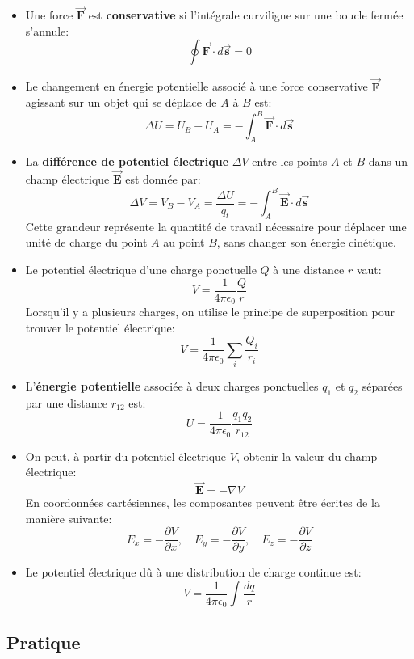 \documentclass[a4paper]{article}
\begin{document}
\begin{itemize}
    \item Une force $ \vec{\textbf{F}} $ est \textbf{conservative} si l'intégrale curviligne sur une boucle fermée s'annule: 
\[ \oint \vec{\textbf{F}} \cdot d \vec{\textbf{s}} = 0 \]
    \item Le changement en énergie potentielle associé à une force conservative $ \vec{\textbf{F}} $ agissant sur un objet qui se déplace 
de $ A $ à $ B $ est: \[ \Delta U = U_B - U_A = - \int_A^B \vec{\textbf{F}} \cdot d \vec{\textbf{s}} \]
    \item La \textbf{différence de potentiel électrique} $ \Delta V $ entre les points $ A $ et $ B $ dans un champ électrique 
$ \vec{\textbf{E}} $ est donnée par: \[ \Delta V = V_B - V_A = \frac{\Delta U}{q_t} = - \int_A^B \vec{\textbf{E}} \cdot d \vec{\textbf{s}} \]
Cette grandeur représente la quantité de travail nécessaire pour déplacer une unité de charge du point $ A $ au point $ B $, sans changer son énergie cinétique.
    \item Le potentiel électrique d'une charge ponctuelle $ Q $ à une distance $ r $ vaut: 
\[ V = \frac{1}{4 \pi \epsilon_0} \frac{Q}{r} \]
Lorsqu'il y a plusieurs charges, on utilise le principe de superposition pour trouver le potentiel électrique: 
\[ V = \frac{1}{4 \pi \epsilon_0} \sum_i \frac{Q_i}{r_i} \]
    \item L'\textbf{énergie potentielle} associée à deux charges ponctuelles $ q_1 $ et $ q_2 $ séparées par une distance $ r_{12} $ est:
\[ U = \frac{1}{4 \pi \epsilon_0} \frac{q_1 q_2}{r_{12}} \]
    \item On peut, à partir du potentiel électrique $ V $, obtenir la valeur du champ électrique: 
\[ \vec{\textbf{E}} = - \nabla V \]
En coordonnées cartésiennes, les composantes peuvent être écrites de la manière suivante: 
\[ E_x = - \frac{\partial V}{\partial x}, \quad E_y = - \frac{\partial V}{\partial y}, \quad E_z = - \frac{\partial V}{\partial z} \]
    \item Le potentiel électrique dû à une distribution de charge continue est: 
\[ V = \frac{1}{4 \pi \epsilon_0} \int \frac{d q}{r} \]

\end{itemize}










\subsection{Pratique}
\end{document}
